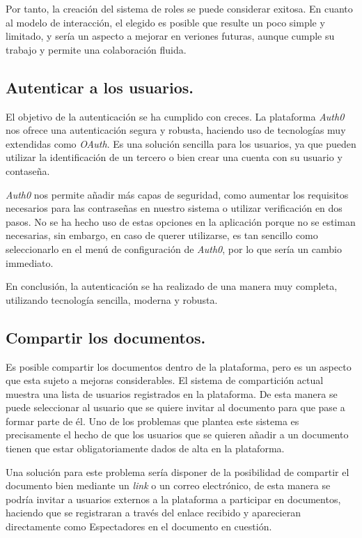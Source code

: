 \documentclass[11pt,spanish,listoffigures]{tfgetsinf}
\begin{document}
Por tanto, la creación del sistema de roles se puede considerar exitosa. En cuanto al modelo de interacción, el elegido es posible que resulte un poco simple y limitado, y sería un aspecto a mejorar en veriones futuras, aunque cumple su trabajo y permite una colaboración fluida. 

\subsection{Autenticar a los usuarios.}
\label{subsec:objetivos-conc-auth}

El objetivo de la autenticación se ha cumplido con creces. La plataforma \textit{Auth0} nos ofrece una autenticación segura y robusta, haciendo uso de tecnologías muy extendidas como \textit{OAuth}. Es una solución sencilla para los usuarios, ya que pueden utilizar la identificación de un tercero o bien crear una cuenta con su usuario y contaseña. 

\textit{Auth0} nos permite añadir más capas de seguridad, como aumentar los requisitos necesarios para las contraseñas en nuestro sistema o utilizar verificación en dos pasos. No se ha hecho uso de estas opciones en la aplicación porque no se estiman necesarias, sin embargo, en caso de querer utilizarse, es tan sencillo como seleccionarlo en el menú de configuración de \textit{Auth0}, por lo que sería un cambio immediato.

En conclusión, la autenticación se ha realizado de una manera muy completa, utilizando tecnología sencilla, moderna y robusta.

\subsection{Compartir los documentos.}
\label{subsec:objetivos-conc-compartir}

Es posible compartir los documentos dentro de la plataforma, pero es un aspecto que esta sujeto a mejoras considerables. El sistema de compartición actual muestra una lista de usuarios registrados en la plataforma. De esta manera se puede seleccionar al usuario que se quiere invitar al documento para que pase a formar parte de él. Uno de los problemas que plantea este sistema es precisamente el hecho de que los usuarios que se quieren añadir a un documento tienen que estar obligatoriamente dados de alta en la plataforma.

Una solución para este problema sería disponer de la posibilidad de compartir el documento bien mediante un \textit{\gls{link}} o un correo electrónico, de esta manera se podría invitar a usuarios externos a la plataforma a participar en documentos, haciendo que se registraran a través del enlace recibido y aparecieran directamente como Espectadores en el documento en cuestión.
\end{document}
